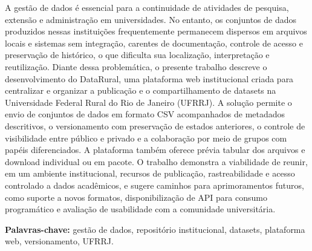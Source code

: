 A gestão de dados é essencial para a continuidade de atividades de pesquisa, extensão e administração em universidades. No entanto, os conjuntos de dados produzidos nessas instituições frequentemente permanecem dispersos em arquivos locais e sistemas sem integração, carentes de documentação, controle de acesso e preservação de histórico, o que dificulta sua localização, interpretação e reutilização. Diante dessa problemática, o presente trabalho descreve o desenvolvimento do DataRural, uma plataforma web institucional criada para centralizar e organizar a publicação e o compartilhamento de datasets na Universidade Federal Rural do Rio de Janeiro (UFRRJ). A solução permite o envio de conjuntos de dados em formato CSV acompanhados de metadados descritivos, o versionamento com preservação de estados anteriores, o controle de visibilidade entre público e privado e a colaboração por meio de grupos com papéis diferenciados. A plataforma também oferece prévia tabular dos arquivos e download individual ou em pacote. O trabalho demonstra a viabilidade de reunir, em um ambiente institucional, recursos de publicação, rastreabilidade e acesso controlado a dados acadêmicos, e sugere caminhos para aprimoramentos futuros, como suporte a novos formatos, disponibilização de API para consumo programático e avaliação de usabilidade com a comunidade universitária.

\vspace{0.5cm}
\noindent\textbf{Palavras-chave:} gestão de dados, repositório institucional, datasets, plataforma web, versionamento, UFRRJ.